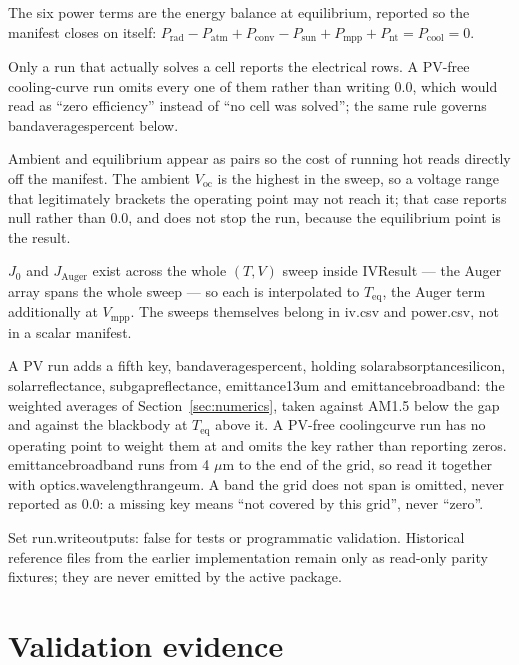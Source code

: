 \documentclass[11pt,a4paper,twoside]{article}
\DeclareRobustCommand{\code}[1]{\begingroup\upshape\ttfamily
  \def\_{\allowbreak\textunderscore\allowbreak}#1\endgroup}
\begin{document}
The six power terms are the energy balance at equilibrium, reported so the
manifest closes on itself: \(P_{\mathrm{rad}}-P_{\mathrm{atm}}+P_{\mathrm{conv}}
-P_{\mathrm{sun}}+P_{\mathrm{mpp}}+P_{\mathrm{nt}}=P_{\mathrm{cool}}=0\).

Only a run that actually solves a cell reports the electrical rows. A PV-free
cooling-curve run omits every one of them rather than writing \(0.0\), which
would read as ``zero efficiency'' instead of ``no cell was solved''; the same
rule governs \code{band\_averages\_percent} below.

Ambient and equilibrium appear as pairs so the cost of running hot reads
directly off the manifest. The ambient \(V_{\mathrm{oc}}\) is the highest in the
sweep, so a voltage range that legitimately brackets the operating point may not
reach it; that case reports \code{null} rather than \(0.0\), and does not stop
the run, because the equilibrium point is the result.

\(J_0\) and \(J_{\mathrm{Auger}}\) exist across the whole \((T,V)\) sweep inside
\code{IVResult} --- the Auger array spans the whole sweep --- so each
is interpolated to \(T_{\mathrm{eq}}\), the Auger term additionally at
\(V_{\mathrm{mpp}}\). The sweeps themselves belong in \code{iv.csv} and
\code{power.csv}, not in a scalar manifest.

\begin{sloppypar}
A PV run adds a fifth key, \code{band\_averages\_percent}, holding
\code{solar\_absorptance\_silicon}, \code{solar\_reflectance},
\code{subgap\_reflectance}, \code{emittance\_8\_13um} and
\code{emittance\_broadband}: the weighted averages of
Section~\ref{sec:numerics}, taken against AM1.5 below the gap and against the
blackbody at \(T_{\mathrm{eq}}\) above it. A PV-free \code{cooling\_curve} run
has no operating point to weight them at and omits the key rather than
reporting zeros. \code{emittance\_broadband} runs from 4 \(\mu\)m to the end of
the grid, so read it together with \code{optics.wavelength\_range\_um}. A band
the grid does not span is omitted, never reported as \(0.0\): a missing key
means ``not covered by this grid'', never ``zero''.
\end{sloppypar}

Set \code{run.write\_outputs: false} for tests or programmatic validation.
Historical reference files from the earlier implementation remain only as
read-only parity fixtures; they are
never emitted by the active package.

\section{Validation evidence}
\label{sec:validation}
\end{document}
